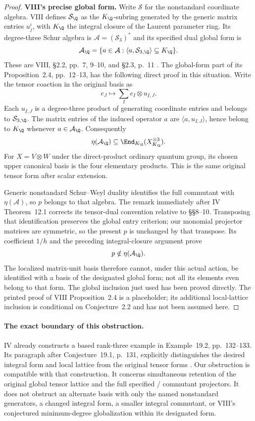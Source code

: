 \begin{proof}
\par\smallskip\noindent\textbf{VIII's precise global form.}\quad
Write $\mathcal S$ for the nonstandard coordinate algebra.
VIII defines $\mathcal S_{\Q}$ as the $K_{\Q}$-subring generated
by the generic matrix entries $u^i_j$, with $K_{\Q}$ the
integral closure of the Laurent parameter ring.
Its degree-three Schur algebra is
$\mathcal A=(\mathcal S_3)^*$ and its specified dual global form is
\[
 \mathcal A_{\Q}
 =\{a\in\mathcal A:
       \langle a,\mathcal S_{3,\Q}\rangle\subseteq K_{\Q}\}.
\]
These are VIII, \S2.2, pp.~7, 9--10, and \S2.3, p.~11
\cite{VIII}.
The global-form part of its Proposition~2.4, pp.~12--13,
has the following direct proof in this situation.
Write the tensor coaction in the original basis as
\[
 e_J\longmapsto\sum_I e_I\otimes u_{I,J}.
\]
Each $u_{I,J}$ is a degree-three product of generating
coordinate entries and belongs to $\mathcal S_{3,\Q}$.
The matrix entries of the induced operator $a$ are
$\langle a,u_{I,J}\rangle$, hence belong to $K_{\Q}$ whenever
$a\in\mathcal A_{\Q}$. Consequently
\[
 \eta(\mathcal A_{\Q})
 \subseteq\End_{K_{\Q}}(X_{K_{\Q}}^{\otimes3}).
\]
For $X=V\otimes W$ under the direct-product ordinary quantum
group, its chosen upper canonical basis is the four elementary
products. This is the same original tensor form after scalar
extension.

Generic nonstandard Schur--Weyl duality identifies the full
commutant with $\eta(\mathcal A)$, so $p$ belongs to that algebra.
The remark immediately after IV Theorem~12.1 corrects its
tensor-dual convention relative to \S\S8--10.
Transposing that identification preserves the global entry
criterion; our monomial projector matrices are symmetric,
so the present $p$ is unchanged by that transpose.
Its coefficient $1/h$ and the preceding integral-closure
argument prove
\[
 p\notin\eta(\mathcal A_{\Q}).
\]
The localized matrix-unit basis therefore cannot, under this
actual action, be identified with a basis of the designated
global form; not all its elements even belong to that form.
The global inclusion just used has been proved directly.
The printed proof of VIII Proposition~2.4 is a placeholder;
its additional local-lattice inclusion is conditional on
Conjecture~2.2 and has not been assumed here.
\end{proof}

\paragraph{The exact boundary of this obstruction.}
IV already constructs a based rank-three example in
Example~19.2, pp.~132--133. Its paragraph after Conjecture~19.1,
p.~131, explicitly distinguishes the desired integral form and
local lattice from the original tensor forms \cite{IV}.
Our obstruction is compatible with that construction.
It concerns simultaneous retention of the original global tensor
lattice and the full specified / commutant
projectors. It does not obstruct an alternate basis with only
the named nonstandard generators, a changed integral form, a
smaller integral commutant, or VIII's conjectured minimum-degree
globalization within its designated form.

